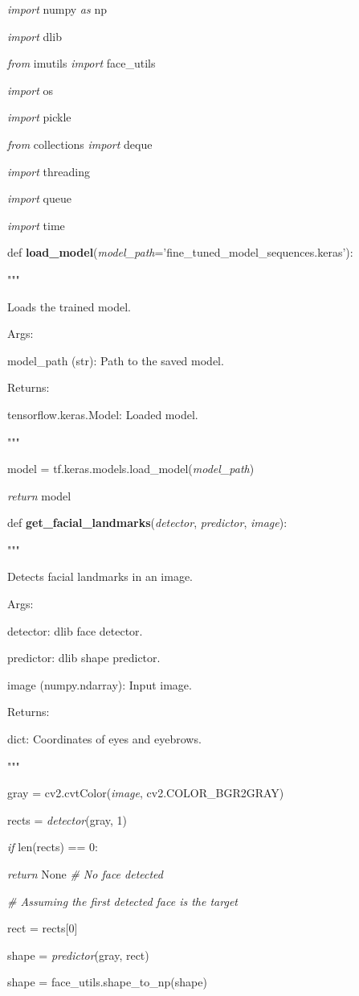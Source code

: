 \documentclass[
]{article}
\begin{document}
\emph{import} numpy \emph{as} np

\emph{import} dlib

\emph{from} imutils \emph{import} face\_utils

\emph{import} os

\emph{import} pickle

\emph{from} collections \emph{import} deque

\emph{import} threading

\emph{import} queue

\emph{import} time

def \textbf{load\_model}(\emph{model\_path}='fine\_tuned\_model\_sequences.keras'):

"""

Loads the trained model.

Args:

model\_path (str): Path to the saved model.

Returns:

tensorflow.keras.Model: Loaded model.

"""

model = tf.keras.models.load\_model(\emph{model\_path})

\emph{return} model

def \textbf{get\_facial\_landmarks}(\emph{detector}, \emph{predictor}, \emph{image}):

"""

Detects facial landmarks in an image.

Args:

detector: dlib face detector.

predictor: dlib shape predictor.

image (numpy.ndarray): Input image.

Returns:

dict: Coordinates of eyes and eyebrows.

"""

gray = cv2.cvtColor(\emph{image}, cv2.COLOR\_BGR2GRAY)

rects = \emph{detector}(gray, 1)

\emph{if} len(rects) == 0:

\emph{return} None \emph{\# No face detected}

\emph{\# Assuming the first detected face is the target}

rect = rects{[}0{]}

shape = \emph{predictor}(gray, rect)

shape = face\_utils.shape\_to\_np(shape)
\end{document}
